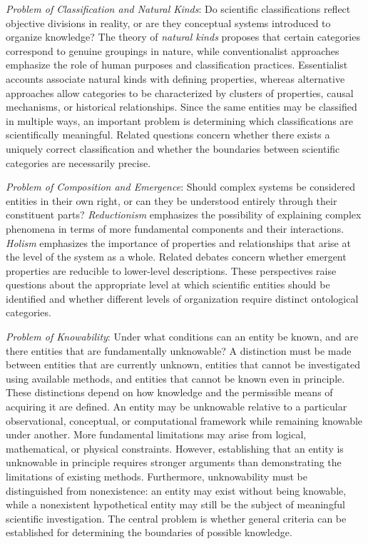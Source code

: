 \emph{Problem of Classification and Natural Kinds}: Do scientific classifications reflect objective divisions in reality, or are they conceptual systems introduced to organize knowledge? The theory of \emph{natural kinds} proposes that certain categories correspond to genuine groupings in nature, while conventionalist approaches emphasize the role of human purposes and classification practices. Essentialist accounts associate natural kinds with defining properties, whereas alternative approaches allow categories to be characterized by clusters of properties, causal mechanisms, or historical relationships. Since the same entities may be classified in multiple ways, an important problem is determining which classifications are scientifically meaningful. Related questions concern whether there exists a uniquely correct classification and whether the boundaries between scientific categories are necessarily precise.

\emph{Problem of Composition and Emergence}: Should complex systems be considered entities in their own right, or can they be understood entirely through their constituent parts? \emph{Reductionism} emphasizes the possibility of explaining complex phenomena in terms of more fundamental components and their interactions. \emph{Holism} emphasizes the importance of properties and relationships that arise at the level of the system as a whole. Related debates concern whether emergent properties are reducible to lower-level descriptions. These perspectives raise questions about the appropriate level at which scientific entities should be identified and whether different levels of organization require distinct ontological categories.

\emph{Problem of Knowability}: Under what conditions can an entity be known, and are there entities that are fundamentally unknowable? A distinction must be made between entities that are currently unknown, entities that cannot be investigated using available methods, and entities that cannot be known even in principle. These distinctions depend on how knowledge and the permissible means of acquiring it are defined. An entity may be unknowable relative to a particular observational, conceptual, or computational framework while remaining knowable under another. More fundamental limitations may arise from logical, mathematical, or physical constraints. However, establishing that an entity is unknowable in principle requires stronger arguments than demonstrating the limitations of existing methods. Furthermore, unknowability must be distinguished from nonexistence: an entity may exist without being knowable, while a nonexistent hypothetical entity may still be the subject of meaningful scientific investigation. The central problem is whether general criteria can be established for determining the boundaries of possible knowledge.

